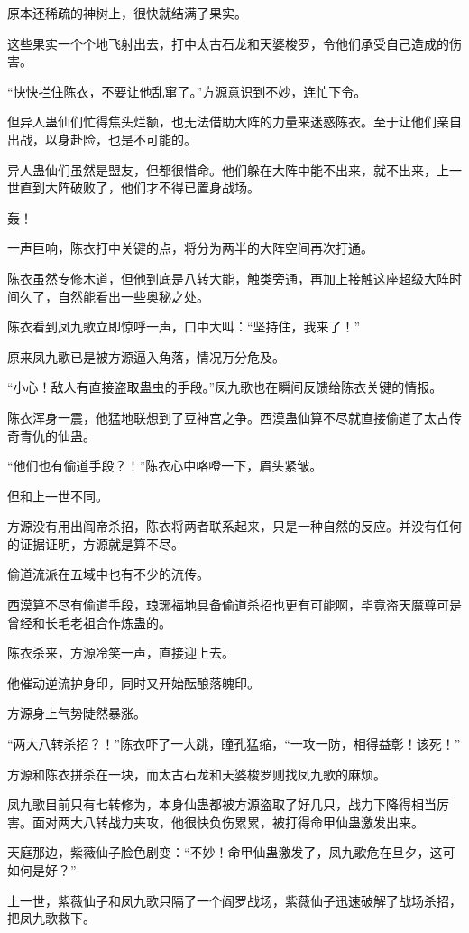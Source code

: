 \begin{this_body}
原本还稀疏的神树上，很快就结满了果实。

这些果实一个个地飞射出去，打中太古石龙和天婆梭罗，令他们承受自己造成的伤害。

“快快拦住陈衣，不要让他乱窜了。”方源意识到不妙，连忙下令。

但异人蛊仙们忙得焦头烂额，也无法借助大阵的力量来迷惑陈衣。至于让他们亲自出战，以身赴险，也是不可能的。

异人蛊仙们虽然是盟友，但都很惜命。他们躲在大阵中能不出来，就不出来，上一世直到大阵破败了，他们才不得已置身战场。

轰！

一声巨响，陈衣打中关键的点，将分为两半的大阵空间再次打通。

陈衣虽然专修木道，但他到底是八转大能，触类旁通，再加上接触这座超级大阵时间久了，自然能看出一些奥秘之处。

陈衣看到凤九歌立即惊呼一声，口中大叫：“坚持住，我来了！”

原来凤九歌已是被方源逼入角落，情况万分危及。

“小心！敌人有直接盗取蛊虫的手段。”凤九歌也在瞬间反馈给陈衣关键的情报。

陈衣浑身一震，他猛地联想到了豆神宫之争。西漠蛊仙算不尽就直接偷道了太古传奇青仇的仙蛊。

“他们也有偷道手段？！”陈衣心中咯噔一下，眉头紧皱。

但和上一世不同。

方源没有用出阎帝杀招，陈衣将两者联系起来，只是一种自然的反应。并没有任何的证据证明，方源就是算不尽。

偷道流派在五域中也有不少的流传。

西漠算不尽有偷道手段，琅琊福地具备偷道杀招也更有可能啊，毕竟盗天魔尊可是曾经和长毛老祖合作炼蛊的。

陈衣杀来，方源冷笑一声，直接迎上去。

他催动逆流护身印，同时又开始酝酿落魄印。

方源身上气势陡然暴涨。

“两大八转杀招？！”陈衣吓了一大跳，瞳孔猛缩，“一攻一防，相得益彰！该死！”

方源和陈衣拼杀在一块，而太古石龙和天婆梭罗则找凤九歌的麻烦。

凤九歌目前只有七转修为，本身仙蛊都被方源盗取了好几只，战力下降得相当厉害。面对两大八转战力夹攻，他很快负伤累累，被打得命甲仙蛊激发出来。

天庭那边，紫薇仙子脸色剧变：“不妙！命甲仙蛊激发了，凤九歌危在旦夕，这可如何是好？”

上一世，紫薇仙子和凤九歌只隔了一个阎罗战场，紫薇仙子迅速破解了战场杀招，把凤九歌救下。


\end{this_body}
